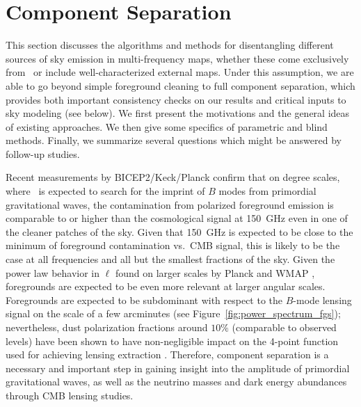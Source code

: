           
\section{Component Separation}
\label{sec:compsep}


This section discusses the algorithms and methods for disentangling different sources of sky emission in multi-frequency maps, whether these come exclusively from \cmbexp\ or include well-characterized external maps. Under this assumption, we are able to go beyond simple foreground cleaning to full component separation, which provides both important consistency checks on our results and critical inputs to sky modeling (see below). We first present the motivations and the general ideas of existing approaches. We then give some specifics of parametric and blind methods. Finally, we summarize several questions which might be answered by follow-up studies.

Recent measurements by BICEP2/Keck/Planck \cite{Ade:2015tva} confirm that on degree scales, where 
\cmbexp\ is expected to search for 
the imprint of $B$ modes from primordial gravitational waves, the contamination from polarized foreground emission is  comparable to or higher than the cosmological signal at 150~GHz even in one of the cleaner patches of the sky.
Given that 150~GHz is expected to be close to the minimum of foreground contamination vs.~CMB signal, this 
is likely to be the case at all frequencies and all but the smallest fractions of the sky.
Given the power law behavior in $\ell$ found on larger scales by Planck and WMAP \cite{Adam:2015tpy,Page:2006hz}, foregrounds are expected to be even more relevant at larger angular scales. Foregrounds are expected to be subdominant  with respect to the $B$-mode lensing signal on the scale of a few arcminutes (see Figure~\ref{fig:power_spectrum_fgs}); nevertheless, dust polarization fractions around $10\%$ (comparable to observed levels) have been shown to have non-negligible impact on the 4-point function used for achieving lensing extraction \cite{Fantaye:2012ha}. Therefore, component separation is a necessary and important step in gaining insight into the amplitude of primordial gravitational waves, as well as the neutrino masses and dark energy abundances through CMB lensing studies.

